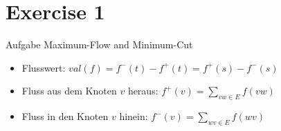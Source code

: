 
\section{Exercise 1}

\setcounter{exercise}{1}

\begin{frame}[allowframebreaks]{Aufgabe \thesection}{Maximum-Flow and Minimum-Cut}
  \begin{exercisenoinc}
  \end{exercisenoinc}
  \begin{requirementsnoinc}
    \begin{itemize}
      \item \alert{Flusswert:} $val(f) = f^-(t) - f^+(t) = f^+(s) - f^-(s)$ 
      \item Fluss \alert{aus} dem Knoten $v$ \alert{heraus}: $\displaystyle f^+(v) = \sum_{vw\in E} f(vw)$ 
      \item Fluss \alert{in} den Knoten $v$ \alert{hinein}: $\displaystyle f^-(v) = \sum_{wv\in E} f(wv)$
    \end{itemize}
  \end{requirementsnoinc}
  \begin{solution}
    \begin{columns}
      \begin{column}{0.4\textwidth}
      \end{column}
      \begin{column}{0.6\textwidth}
\end{column}
\end{columns}
\end{solution}
\end{frame}
